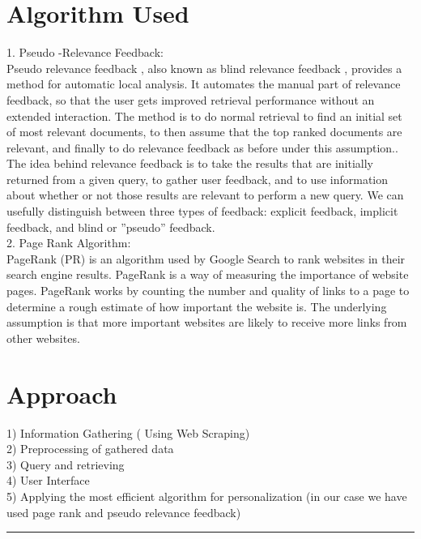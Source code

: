 \section{Algorithm Used}
1. Pseudo -Relevance Feedback:\\
Pseudo relevance feedback , also known as blind relevance feedback , provides a method for
automatic local analysis. It automates the manual part of relevance feedback, so that the
user gets improved retrieval performance without an extended interaction. The method is
to do normal retrieval to find an initial set of most relevant documents, to then assume that
the top ranked documents are relevant, and finally to do relevance feedback as before
under this assumption.. The idea behind relevance feedback is to take the results that are
initially returned from a given query, to gather user feedback, and to use information about
whether or not those results are relevant to perform a new query. We can usefully
distinguish between three types of feedback: explicit feedback, implicit feedback, and blind
or ”pseudo” feedback.\\
2. Page Rank Algorithm:\\
PageRank (PR) is an algorithm used by Google Search to rank websites in their search engine
results. PageRank is a way of measuring the importance of website pages. PageRank works
by counting the number and quality of links to a page to determine a rough estimate of how
important the website is. The underlying assumption is that more important websites are
likely to receive more links from other websites.\\

\section{ Approach}
1) Information Gathering ( Using Web Scraping)\\
2) Preprocessing of gathered data\\
3) Query and retrieving\\
4) User Interface\\
5) Applying the most efficient algorithm for personalization (in our case we have used page
rank and pseudo relevance feedback)\\

\vspace{10mm}
\hrule
